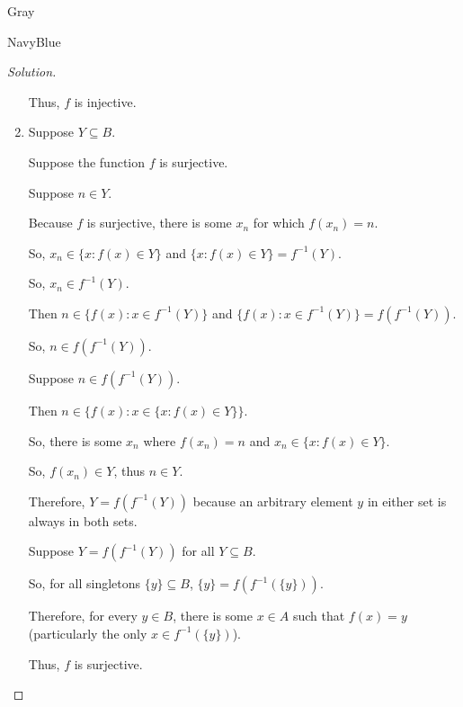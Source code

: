 \documentclass[12pt]{amsart}
\theoremstyle{named}
\newenvironment{soln}
{\begin{color}{Gray}\begin{framed}\begin{color}{NavyBlue}\begin{proof}[Solution]
\doublespacing}
{\end{proof}\end{color}\end{framed}\end{color}}
\theoremstyle{definition}
\begin{document}
\begin{soln}
\begin{enumerate}
        \noindent Thus, $f$ is injective.  
        
        \phantom{ }

        \item
        \phantom{ }
        
        \noindent Suppose $Y \subseteq B$.

        \noindent Suppose the function $f$ is surjective. 

        \begin{adjustwidth}{2em}{0em}
            \noindent Suppose $n \in Y$.

            \noindent Because $f$ is surjective, there is some $x_n$ for which $f(x_n) = n$.
    
            \noindent So, $x_n \in \{x : f(x) \in Y\}$ and $\{x : f(x) \in Y\} = f^{-1}(Y)$.
    
            \noindent So, $x_n \in f^{-1}(Y)$. 
    
            \noindent Then $n \in \{f(x) : x \in f^{-1}(Y)\}$ and $\{f(x) : x \in f^{-1}(Y)\} = f(f^{-1}(Y))$.
    
            \noindent So, $n \in f(f^{-1}(Y))$.

            \phantom{ }

            \noindent Suppose $n \in f(f^{-1}(Y))$. 

            \noindent Then $n \in \{f(x) : x \in \{x : f(x) \in Y\}\}$.

            \noindent So, there is some $x_n$ where $f(x_n) = n$ and $x_n \in \{x : f(x) \in Y\}$. 

            \noindent So, $f(x_n) \in Y$, thus $n \in Y$. 
        \end{adjustwidth}

        \noindent Therefore, $Y = f(f^{-1}(Y))$ because an arbitrary element $y$ in either set is always in both sets. 


        \phantom{ }

        \noindent Suppose $Y = f(f^{-1}(Y))$ for all $Y \subseteq B$.

        \noindent So, for all singletons $\{y\} \subseteq B$, $\{y\} = f(f^{-1}(\{y\}))$.

        \noindent Therefore, for every $y \in B$, there is some $x \in A$ such that $f(x) = y$ 
        (particularly the only $x \in f^{-1}(\{y\})$). 

        \noindent Thus, $f$ is surjective. 
    \end{enumerate}
\end{soln}
\end{document}
